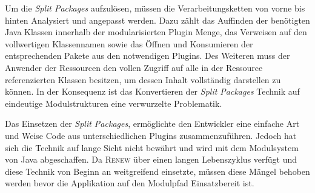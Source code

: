 		Um die \textit{Split Packages} aufzulösen, müssen die Verarbeitungsketten von vorne bis hinten Analysiert und angepasst werden. Dazu zählt das Auffinden der benötigten Java Klassen innerhalb der modularisierten Plugin Menge, das Verweisen auf den vollwertigen Klassennamen sowie das Öffnen und Konsumieren der entsprechenden Pakete aus den notwendigen Plugins. Des Weiteren muss der Anwender der Ressourcen den vollen Zugriff auf alle in der Ressource referenzierten Klassen besitzen, um dessen Inhalt vollständig darstellen zu können. In der Konsequenz ist das Konvertieren der \textit{Split Packages} Technik auf eindeutige Modulstrukturen eine verwurzelte Problematik. \bigbreak

		Das Einsetzen der \textit{Split Packages}, ermöglichte den Entwickler eine einfache Art und Weise Code aus unterschiedlichen Plugins zusammenzuführen. Jedoch hat sich die Technik auf lange Sicht nicht bewährt und wird mit dem Modulsystem von Java abgeschaffen. Da \textsc{Renew} über einen langen Lebenszyklus verfügt und diese Technik von Beginn an weitgreifend einsetzte, müssen diese Mängel behoben werden bevor die Applikation auf den Modulpfad Einsatzbereit ist. 

